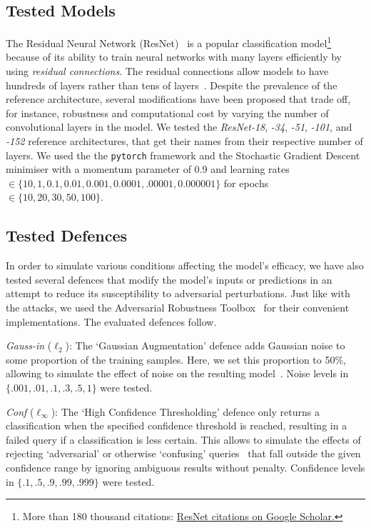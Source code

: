 \subsection{Tested Models}
\label{models}

The Residual Neural Network (ResNet)~\cite{resnet} is a popular classification model\footnote{More than 180 thousand citations: \href{https://scholar.google.com/scholar?cites=9281510746729853742}{ResNet citations on Google Scholar.}} because of its ability to train neural networks with many layers efficiently by using \textit{residual connections}. 
The residual connections allow models to have hundreds of layers rather than tens of layers~\cite{resnet,vgg}. 
Despite the prevalence of the reference architecture, several modifications have been proposed that trade off, for instance, robustness and computational cost by varying the number of convolutional layers in the model. 
We tested the \textit{ResNet-18}, \textit{-34}, \textit{-51}, \textit{-101}, and \textit{-152} reference architectures, that get their names from their respective number of layers. 
We used the the \texttt{pytorch} framework and the Stochastic Gradient Descent minimiser with a momentum parameter of 0.9 and learning rates $\in \{10, 1, 0.1, 0.01, 0.001, 0.0001, .00001, 0.000001\}$ for epochs $\in \{ 10, 20, 30, 50, 100\}$.

\subsection{Tested Defences}
\label{defences}

In order to simulate various conditions affecting the model's efficacy, we have also tested several defences that modify the model's inputs or predictions in an attempt to reduce its susceptibility to adversarial perturbations. 
Just like with the attacks, we used the Adversarial Robustness Toolbox~\cite{art2018} for their convenient implementations. The evaluated defences follow.


\textit{Gauss-in} ($\ell_2$): The `Gaussian Augmentation' defence adds Gaussian noise to some proportion of the training samples. 
Here, we set this proportion to 50\%, allowing to simulate the effect of noise on the resulting model~\cite{gauss_aug}. 
Noise levels in $\{.001, .01, .1, .3, .5, 1\}$ were tested.


\textit{Conf} ($\ell_{\infty}$): The `High Confidence Thresholding' defence only returns a classification when the specified confidence threshold is reached, resulting in a failed query if a classification is less certain. 
This allows to simulate the effects of rejecting `adversarial' or otherwise `confusing' queries~\cite{high_conf} that fall outside the given confidence range by ignoring ambiguous results without penalty. 
Confidence levels in $\{.1, .5, .9, .99, .999\}$ were tested.


